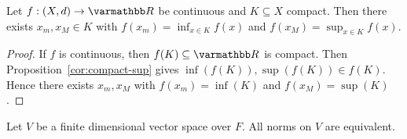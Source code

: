     \begin{theorem}
        Let $f:(X,d) \rightarrow \bfR$ be continuous and $K \subseteq X$ compact. Then there exists $x_m,x_M \in K$ with $f(x_m) = \inf_{x \in K}f(x)$ and $f(x_M) = \sup_{x \in K}f(x)$.
    \end{theorem}
        \begin{proof}
            If $f$ is continuous, then $f(K) \subseteq \bfR$ is compact. Then Proposition~\ref{cor:compact-sup} gives $\inf(f(K)),\sup(f(K)) \in f(K)$. Hence there exists $x_m,x_M $ with $f(x_m) = \inf(K)$ and $f(x_M) = \sup(K)$.
        \end{proof}

    \begin{proposition}
        Let $V$ be a finite dimensional vector space over $F$. All norms on $V$ are equivalent.
    \end{proposition}
